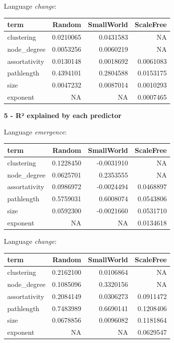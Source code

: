 \documentclass[
]{article}
\begin{document}
Language \emph{change}:

\begin{longtable}[]{@{}lrrr@{}}
\toprule()
term & Random & SmallWorld & ScaleFree \\
\midrule()
\endhead
clustering & 0.0210065 & 0.0431583 & NA \\
node\_degree & 0.0053256 & 0.0060219 & NA \\
assortativity & 0.0130148 & 0.0018692 & 0.0061083 \\
pathlength & 0.4394101 & 0.2804588 & 0.0153175 \\
size & 0.0047232 & 0.0087014 & 0.0010293 \\
exponent & NA & NA & 0.0007465 \\
\bottomrule()
\end{longtable}

\textbf{5 - R² explained by each predictor}

Language \emph{emergence}:

\begin{longtable}[]{@{}lrrr@{}}
\toprule()
term & Random & SmallWorld & ScaleFree \\
\midrule()
\endhead
clustering & 0.1228450 & -0.0031910 & NA \\
node\_degree & 0.0625701 & 0.2353555 & NA \\
assortativity & 0.0986972 & -0.0024494 & 0.0468897 \\
pathlength & 0.5759031 & 0.6008074 & 0.0543806 \\
size & 0.0592300 & -0.0021660 & 0.0531710 \\
exponent & NA & NA & 0.0134618 \\
\bottomrule()
\end{longtable}

Language \emph{change}:

\begin{longtable}[]{@{}lrrr@{}}
\toprule()
term & Random & SmallWorld & ScaleFree \\
\midrule()
\endhead
clustering & 0.2162100 & 0.0106864 & NA \\
node\_degree & 0.1085096 & 0.3320156 & NA \\
assortativity & 0.2084149 & 0.0306273 & 0.0911472 \\
pathlength & 0.7483989 & 0.6690141 & 0.1208406 \\
size & 0.0678856 & 0.0096082 & 0.1181864 \\
exponent & NA & NA & 0.0629547 \\
\bottomrule()
\end{longtable}
\end{document}

